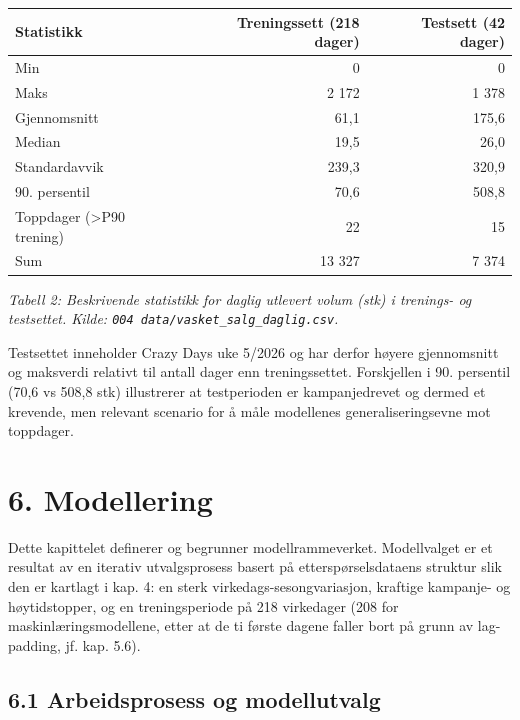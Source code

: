 \documentclass[
  norsk,
  11pt,
  a4paper,
]{article}
\newcounter{none} %
\begin{document}
{\def\LTcaptype{none} %
\begin{longtable}[]{@{}lrr@{}}
\toprule\noalign{}
Statistikk & Treningssett (218 dager) & Testsett (42 dager) \\
\midrule\noalign{}
\endhead
\bottomrule\noalign{}
\endlastfoot
Min & 0 & 0 \\
Maks & 2 172 & 1 378 \\
Gjennomsnitt & 61,1 & 175,6 \\
Median & 19,5 & 26,0 \\
Standardavvik & 239,3 & 320,9 \\
90. persentil & 70,6 & 508,8 \\
Toppdager (\textgreater P90 trening) & 22 & 15 \\
Sum & 13 327 & 7 374 \\
\end{longtable}
}

{\centering\small

\emph{Tabell 2: Beskrivende statistikk for daglig utlevert volum (stk) i
trenings- og testsettet. Kilde:
\texttt{004\ data/vasket\_salg\_daglig.csv}.}

\par}

Testsettet inneholder Crazy Days uke 5/2026 og har derfor høyere
gjennomsnitt og maksverdi relativt til antall dager enn treningssettet.
Forskjellen i 90. persentil (70,6 vs 508,8 stk) illustrerer at
testperioden er kampanjedrevet og dermed et krevende, men relevant
scenario for å måle modellenes generaliseringsevne mot toppdager.

\section{6. Modellering}\label{modellering}

Dette kapittelet definerer og begrunner modellrammeverket. Modellvalget
er et resultat av en iterativ utvalgsprosess basert på
etterspørselsdataens struktur slik den er kartlagt i kap. 4: en sterk
virkedags-sesongvariasjon, kraftige kampanje- og høytidstopper, og en
treningsperiode på 218 virkedager (208 for maskinlæringsmodellene, etter
at de ti første dagene faller bort på grunn av lag-padding, jf. kap.
5.6).

\subsection{6.1 Arbeidsprosess og
modellutvalg}\label{arbeidsprosess-og-modellutvalg}
\end{document}
